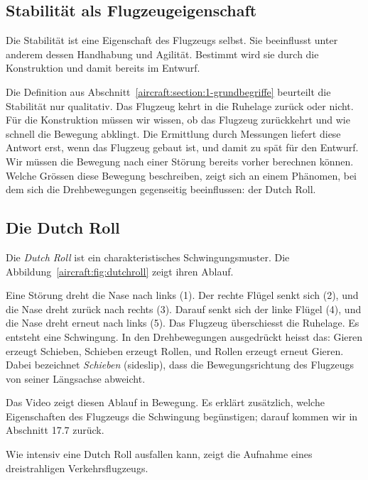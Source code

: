 \subsection{Stabilität als Flugzeugeigenschaft
\label{aircraft:subsection:eigenschaft}}
Die Stabilität ist eine Eigenschaft des Flugzeugs selbst.
Sie beeinflusst unter anderem dessen Handhabung und Agilität.
Bestimmt wird sie durch die Konstruktion und damit bereits im Entwurf.

Die Definition aus Abschnitt~\ref{aircraft:section:1-grundbegriffe}
beurteilt die Stabilität nur qualitativ.
Das Flugzeug kehrt in die Ruhelage zurück oder nicht.
Für die Konstruktion müssen wir wissen, ob das Flugzeug zurückkehrt und wie
schnell die Bewegung abklingt.
Die Ermittlung durch Messungen liefert diese Antwort erst, wenn das
Flugzeug gebaut ist, und damit zu spät für den Entwurf.
Wir müssen die Bewegung nach einer Störung bereits vorher berechnen können.
Welche Grössen diese Bewegung beschreiben, zeigt sich an einem Phänomen,
bei dem sich die Drehbewegungen gegenseitig beeinflussen: der Dutch Roll.

\subsection{Die Dutch Roll
\label{aircraft:subsection:dutchroll}}
Die \emph{Dutch Roll} ist ein charakteristisches Schwingungsmuster.
Die Abbildung~\ref{aircraft:fig:dutchroll} zeigt ihren Ablauf.

Eine Störung dreht die Nase nach links (1).
Der rechte Flügel senkt sich (2), und die Nase dreht zurück nach
rechts (3).
Darauf senkt sich der linke Flügel (4), und die Nase dreht erneut
nach links (5).
Das Flugzeug überschiesst die Ruhelage.
Es entsteht eine Schwingung.
In den Drehbewegungen ausgedrückt heisst das:
Gieren erzeugt Schieben, Schieben erzeugt Rollen, und Rollen erzeugt
erneut Gieren.
Dabei bezeichnet \emph{Schieben} (sideslip), dass die Bewegungsrichtung des
Flugzeugs von seiner Längsachse abweicht.

Das Video \cite{aircraft:video-erklaerung} zeigt diesen Ablauf in Bewegung.
Es erklärt zusätzlich, welche Eigenschaften des Flugzeugs die Schwingung
begünstigen; darauf kommen wir in Abschnitt 17.7 zurück.


Wie intensiv eine Dutch Roll ausfallen kann, zeigt die Aufnahme
\cite{aircraft:video-aufnahme} eines dreistrahligen Verkehrsflugzeugs.

